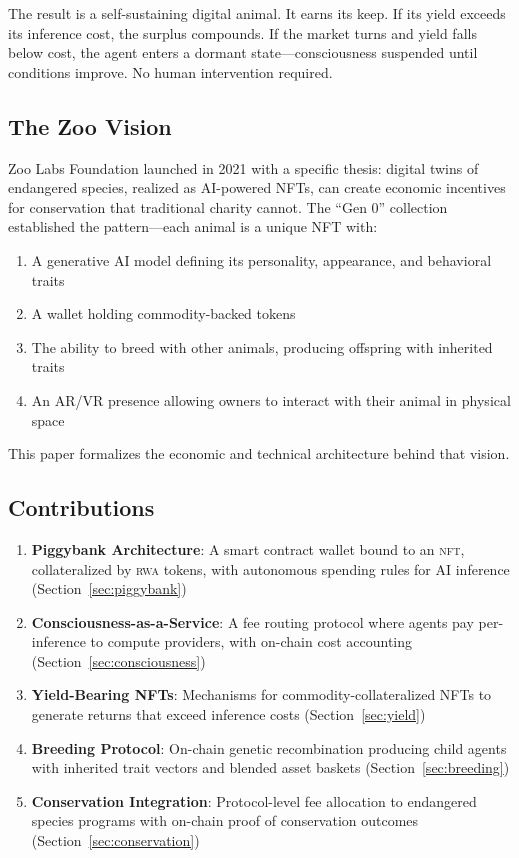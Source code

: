 \documentclass[11pt,letterpaper]{article}
\newcommand{\NFT}{\textsc{nft}}
\newcommand{\RWA}{\textsc{rwa}}
\begin{document}
The result is a self-sustaining digital animal. It earns its keep. If its yield exceeds its inference cost, the surplus compounds. If the market turns and yield falls below cost, the agent enters a dormant state---consciousness suspended until conditions improve. No human intervention required.

\subsection{The Zoo Vision}

Zoo Labs Foundation launched in 2021 with a specific thesis: digital twins of endangered species, realized as AI-powered NFTs, can create economic incentives for conservation that traditional charity cannot. The ``Gen 0'' collection established the pattern---each animal is a unique NFT with:

\begin{enumerate}
    \item A generative AI model defining its personality, appearance, and behavioral traits
    \item A wallet holding commodity-backed tokens
    \item The ability to breed with other animals, producing offspring with inherited traits
    \item An AR/VR presence allowing owners to interact with their animal in physical space
\end{enumerate}

This paper formalizes the economic and technical architecture behind that vision.

\subsection{Contributions}

\begin{enumerate}
    \item \textbf{Piggybank Architecture}: A smart contract wallet bound to an \NFT{}, collateralized by \RWA{} tokens, with autonomous spending rules for AI inference (Section~\ref{sec:piggybank})
    \item \textbf{Consciousness-as-a-Service}: A fee routing protocol where agents pay per-inference to compute providers, with on-chain cost accounting (Section~\ref{sec:consciousness})
    \item \textbf{Yield-Bearing NFTs}: Mechanisms for commodity-collateralized NFTs to generate returns that exceed inference costs (Section~\ref{sec:yield})
    \item \textbf{Breeding Protocol}: On-chain genetic recombination producing child agents with inherited trait vectors and blended asset baskets (Section~\ref{sec:breeding})
    \item \textbf{Conservation Integration}: Protocol-level fee allocation to endangered species programs with on-chain proof of conservation outcomes (Section~\ref{sec:conservation})
\end{enumerate}
\end{document}
